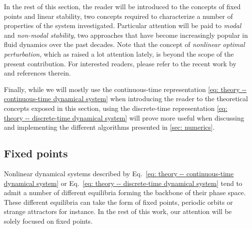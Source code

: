   In the rest of this section, the reader will be introduced to the concepts of fixed points and linear stability, two concepts required to characterize a number of properties of the system investigated. Particular attention will be paid to \emph{modal} and \emph{non-modal stability}, two approaches that have become increasingly popular in fluid dynamics over the past decades. Note that the concept of \emph{nonlinear optimal perturbation}, which as raised a lot attention lately, is beyond the scope of the present contribution. For interested readers, please refer to the recent work by \cite{nonlinear_optimal:kerswell:2014} and references therein.

  Finally, while we will mostly use the continuous-time representation \eqref{eq: theory -- continuous-time dynamical system} when introducing the reader to the theoretical concepts exposed in this section, using the discrete-time representation \eqref{eq: theory -- discrete-time dynamical system} will prove more useful when discussing and implementing the different algorithms presented in \textsection \ref{sec: numerics}.



  \subsection{Fixed points}
  \label{subsec: theory-fixed points}

  Nonlinear dynamical systems described by Eq.~\eqref{eq: theory -- continuous-time dynamical system} or Eq.~\eqref{eq: theory -- discrete-time dynamical system} tend to admit a number of different equilibria forming the backbone of their phase space. These different equilibria can take the form of fixed points, periodic orbits or strange attractors for instance. In the rest of this work, our attention will be solely focused on fixed points.

